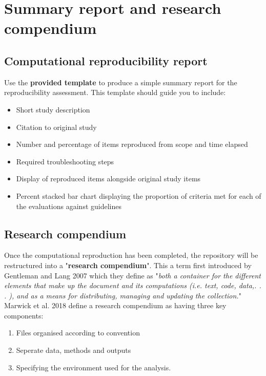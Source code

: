 \section{Summary report and research compendium}

\subsection{Computational reproducibility report} \label{sec:report}

Use the \textbf{provided template} to produce a simple summary report for the reproducibility assessment. This template should guide you to include:

\begin{itemize}
    \item Short study description
    \item Citation to original study
    \item Number and percentage of items reproduced from scope and time elapsed
    \item Required troubleshooting steps
    \item Display of reproduced items alongside original study items
    \item Percent stacked bar chart displaying the proportion of criteria met for each of the evaluations against guidelines
\end{itemize}

\vspace{1cm}
\subsection{Research compendium} \label{sec:compendium}

Once the computational reproduction has been completed, the repository will be restructured into a "\textbf{research compendium}". This a term first introduced by Gentleman and Lang 2007\autocite{gentleman_statistical_2007} which they define as "\textit{both a container for the different elements that make up the document and its computations (i.e. text, code, data,. . . ), and as a means for distributing, managing and updating the collection.}"\autocite{gentleman_statistical_2007} Marwick et al. 2018 define a research compendium as having three key components:
\begin{enumerate}
    \item Files organised according to convention
    \item Seperate data, methods and outputs
    \item Specifying the environment used for the analysis.\autocite{marwick_packaging_2018}
\end{enumerate}

